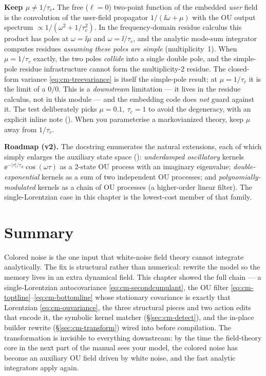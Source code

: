 \begin{gotcha}
\textbf{Keep $\mu \neq 1/\tau_c$.} The free ($\ell = 0$) two-point function of the
embedded \emph{user} field is the convolution of the user-field propagator
$1/(\ii\omega + \mu)$ with the OU output spectrum $\propto 1/(\omega^2 +
1/\tau_c^2)$. In the frequency-domain residue calculus this product has poles at
$\omega = \ii\mu$ and $\omega = \ii/\tau_c$, and the analytic mode-sum integrator
computes residues \emph{assuming these poles are simple} (multiplicity~1). When
$\mu = 1/\tau_c$ exactly, the two poles \emph{collide} into a single double pole,
and the simple-pole residue infrastructure cannot form the multiplicity-2
residue. The closed-form variance \eqref{eq:cm-treevariance} is itself the
simple-pole result; at $\mu = 1/\tau_c$ it is the limit of a $0/0$. This is a
\emph{downstream} limitation --- it lives in the residue calculus, not in this
module --- and the embedding code does \emph{not} guard against it. The test
deliberately picks $\mu = 0.1,\ \tau_c = 1$ to avoid the degeneracy, with an
explicit inline note (). When you
parameterise a markovianized theory, keep $\mu$ away from $1/\tau_c$.
\end{gotcha}

\begin{note}
\textbf{Roadmap (v2).} The docstring enumerates the natural extensions, each of
which simply enlarges the auxiliary state space
(): \emph{underdamped oscillatory}
kernels $\ee^{-|\tau|/\tau_d}\cos(\omega\tau)$ as a 2-state OU process with an
imaginary eigenvalue; \emph{double-exponential} kernels as a sum of two
independent OU processes; and \emph{polynomially-modulated} kernels as a chain of
OU processes (a higher-order linear filter). The single-Lorentzian case in this
chapter is the lowest-cost member of that family.
\end{note}

\section{Summary}

Colored noise is the one input that white-noise field theory cannot integrate
analytically. The fix is structural rather than numerical: rewrite the model so
the memory lives in an extra dynamical field. This chapter showed the full chain
--- a single-Lorentzian autocovariance \eqref{eq:cm-secondcumulant}, the OU filter
\eqref{eq:cm-toptline}--\eqref{eq:cm-bottomline} whose stationary covariance is
exactly that Lorentzian \eqref{eq:cm-ouvariance}, the three \msrjd{} structural
pieces and two action edits that encode it, the symbolic kernel matcher
 (\S\ref{sec:cm-detect}), and the in-place builder
rewrite  (\S\ref{sec:cm-transform}) wired into
 before compilation. The transformation is invisible to everything
downstream: by the time the field-theory core in the next part of the manual sees
your model, the colored noise has become an auxiliary OU field driven by white
noise, and the fast analytic integrators apply again.
